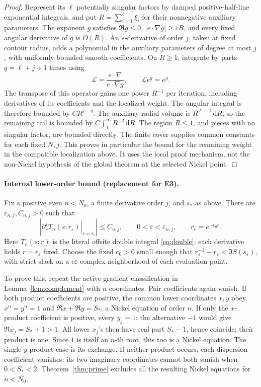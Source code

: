 \documentclass[11pt]{article}
\numberwithin{equation}{section}
\theoremstyle{definition}
\newcommand{\dd}{\,\mathrm d}
\newcommand{\eps}{\varepsilon}
\begin{document}
\begin{proof}
Represent its \(\ell\) potentially singular factors by damped
positive-half-line exponential integrals, and put
\(R=\sum_{i=1}^{\ell}\xi_i\) for their nonnegative auxiliary
parameters. The exponent \(g\) satisfies \(\Re g\le0\),
\(|e\cdot\nabla g|\ge cR\), and every fixed angular derivative
of \(g\) is \(O(R)\). An \(s\)-derivative of order \(j\), taken
at fixed contour radius, adds a polynomial in the auxiliary parameters
of degree at most \(j\), with uniformly bounded smooth coefficients.
On \(R\ge1\), integrate by parts \(q=\ell+j+1\) times using
\[
 \mathcal L=\frac{e\cdot\nabla}{e\cdot\nabla g},
 \qquad \mathcal L e^g=e^g.
\]
The transpose of this operator gains one power \(R^{-1}\) per
iteration, including derivatives of its coefficients and the localized
weight. The angular integral is therefore bounded by \(CR^{j-q}\).
The auxiliary radial volume is \(R^{\ell-1}\dd R\), so the
remaining tail is bounded by \(C\int_1^\infty R^{-2}\dd R\).
The region \(R\le1\), and pieces with no singular factor, are bounded
directly. The finite cover supplies common constants for each fixed
\(N,j\). This proves in particular the bound for the remaining
weight in the compatible localization above. It uses the local proof
mechanism, not the non-Nickel hypothesis of the global theorem at
the selected Nickel point.
\end{proof}

\paragraph{Internal lower-order bound (replacement for E3).}
Fix a positive even \(n<N_0\), a finite derivative order \(j\), and
\(s_*\) as above. There are \(\eps_{n,j},C_{n,j}>0\) such that
\[
 \left|\left.\partial_s^j T_n(s;r_\eps)\right|_{s=s_\eps}\right|
 \le C_{n,j},\qquad 0<\eps<\eps_{n,j},\qquad
 r_\eps=e^{-c_0\eps}.
\]
Here \(T_n(s;r)\) is the literal offsite double integral
\eqref{eq:double}; each derivative holds \(r=r_\eps\) fixed.
Choose the fixed \(c_0>0\) small enough that
\(r_\eps^{-1}-r_\eps<\Im S(s_\eps)\), with strict slack on a
\(c\eps\) complex neighborhood of each evaluation point.

To prove this, repeat the active-gradient classification in
Lemma~\ref{lem:complement} with \(n\) coordinates. Pair coefficients
again vanish. If both product coefficients are positive, the common
lower coordinates \(x,y\) obey \(x^n=y^n=1\) and
\(\Re x+\Re y=S_*\), a Nickel equation of order \(n\).
If only the \(x\)-product coefficient is positive, every \(y_j=1\):
the alternative \(-1\) would give \(\Re x_j=S_*+1>1\).
All lower \(x_j\)'s then have real part \(S_*-1\), hence coincide;
their product is one. Since \(1\) is itself an \(n\)-th root,
this too is a Nickel equation. The single \(y\)-product case is its
exchange. If neither product occurs, each dispersion coefficient
vanishes: its two imaginary coordinates cannot both vanish when
\(0<S_*<2\). Theorem~\ref{thm:prime} excludes all the resulting
Nickel equations for \(n<N_0\).
\end{document}
